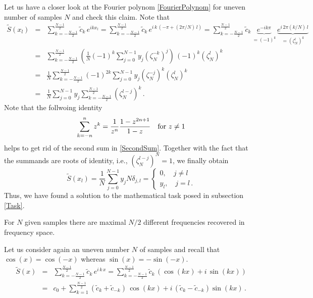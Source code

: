 \documentclass[a4paper, 10pt]{article}
\begin{document}
{Let us have a closer look at the Fourier polynom \eqref{FourierPolynom} for uneven number of samples $N$ and check this claim. Note that
\begin{eqnarray}
\tilde S(x_l) &=& \sum\limits_{k=-\frac{N-1}{2}}^{\frac{N-1}{2}} \tilde c_k \, e^{i k x_l} = \sum\limits_{k=-\frac{N-1}{2}}^{\frac{N-1}{2}} \tilde c_k \, e^{i \, k\, (-\pi + (2\pi/N) \,l)} = \sum\limits_{k=-\frac{N-1}{2}}^{\frac{N-1}{2}} \tilde c_k \, \underbrace{e^{-i k \pi}}_{\text{$=(-1)^k$}} \, \underbrace{e^{i\, 2\pi (k/N) \,l}}_{\text{$= \left(\zeta^l_N\right)^k$}} \nonumber \\
&=& \sum\limits_{k=-\frac{N-1}{2}}^{\frac{N-1}{2}} \left( \frac1N (-1)^k \sum\limits_{j=0}^{N-1} y_j \left(\zeta^{-k}_N\right)^j\right) \, (-1)^k\left( \zeta^l_N\right)^k \nonumber \\
&=& \frac1N \sum\limits_{k=-\frac{N-1}{2}}^{\frac{N-1}{2}} (-1)^{2k} \sum\limits_{j=0}^{N-1}y_j \left( \zeta^{-j}_N\right)^k \left( \zeta^l_N\right)^k \nonumber \\
&=& \frac1N \sum\limits_{j=0}^{N-1} y_j  \sum\limits_{k=-\frac{N-1}{2}}^{\frac{N-1}{2}}\left( \zeta^{l-j}_N\right)^k\,. \label{SecondSum}
\end{eqnarray}
Note that the follwoing identity
\begin{equation*}
\sum\limits_{k=-n}^{n} z^k = \frac{1}{z^{n}} \frac{1-z^{2n+1}}{1-z} \quad \textnormal{for } z\neq1
\end{equation*}
helps to get rid of the second sum in \eqref{SecondSum}. Together with the fact that the summands are roots of identity, i.e., $\left( \zeta^{l-j}_N \right)^N = 1$, we finally obtain
\begin{equation*}
\tilde S(x_l) = \frac1N \sum\limits_{j=0}^{N-1} y_j N \delta_{j,l} = \begin{cases} 0, \quad j\neq l \\ y_l, \quad j=l\,.\end{cases}
\end{equation*}
Thus, we have found a solution to the mathematical task posed in subsection \ref{Task}.


\vspace{0.5cm}

 For $N$ given samples there are maximal $N/2$ different frequencies recovered in frequency space.

Let us consider again an uneven number $N$ of samples and recall that $\cos(x)=\cos(-x)$ whereas $\sin(x) = -\sin(-x)$.
\begin{eqnarray*}
\tilde S(x) &=& \sum\limits_{k=-\frac{N-1}{2}}^{\frac{N-1}{2}} \tilde c_k \, e^{i\,k\,x} = \sum\limits_{k=-\frac{N-1}{2}}^{\frac{N-1}{2}} \tilde c_k \, \left( \cos(kx) + i\, \sin(kx)\right)\\
&=& c_0 +  \sum\limits_{k=1}^{\frac{N-1}{2}} \left(\tilde c_{k} + \tilde c_{-k}\right) \,\cos(kx) + i\,\left(\tilde c_{k} - \tilde c_{-k}\right) \sin(kx)\,.
\end{eqnarray*}

}
\end{document}
